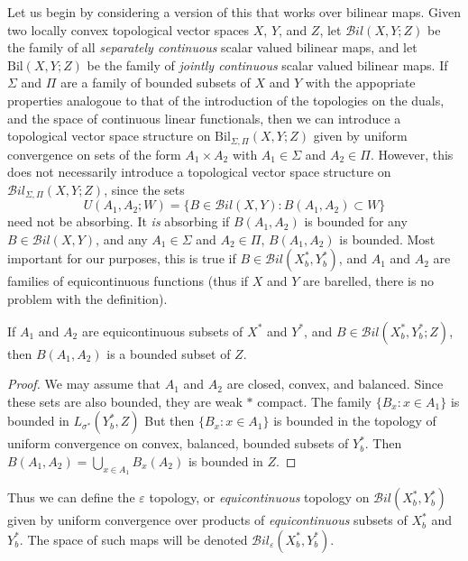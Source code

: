 Let us begin by considering a version of this that works over bilinear maps. Given two locally convex topological vector spaces $X$, $Y$, and $Z$, let $\mathcal{B}il(X,Y;Z)$ be the family of all \emph{separately continuous} scalar valued bilinear maps, and let $\text{Bil}(X,Y;Z)$ be the family of \emph{jointly continuous} scalar valued bilinear maps. If $\Sigma$ and $\Pi$ are a family of bounded subsets of $X$ and $Y$ with the appopriate properties analogoue to that of the introduction of the topologies on the duals, and the space of continuous linear functionals, then we can introduce a topological vector space structure on $\text{Bil}_{\Sigma,\Pi}(X,Y;Z)$ given by uniform convergence on sets of the form $A_1 \times A_2$ with $A_1 \in \Sigma$ and $A_2 \in \Pi$. However, this does not necessarily introduce a topological vector space structure on $\mathcal{B}il_{\Sigma,\Pi}(X,Y;Z)$, since the sets
%
\[ U(A_1,A_2;W) = \{ B \in \mathcal{B}il(X,Y): B(A_1, A_2) \subset W \} \]
%
need not be absorbing. It \emph{is} absorbing if $B(A_1,A_2)$ is bounded for any $B \in \mathcal{B}il(X,Y)$, and any $A_1 \in \Sigma$ and $A_2 \in \Pi$, $B(A_1,A_2)$ is bounded. Most important for our purposes, this is true if $B \in \mathcal{B}il(X^*_b, Y^*_b)$, and $A_1$ and $A_2$ are families of equicontinuous functions (thus if $X$ and $Y$ are barelled, there is no problem with the definition).

\begin{lemma}
    If $A_1$ and $A_2$ are equicontinuous subsets of $X^*$ and $Y^*$, and $B \in \mathcal{B}il(X^*_b, Y^*_b; Z)$, then $B(A_1,A_2)$ is a bounded subset of $Z$.
\end{lemma}
\begin{proof}
    We may assume that $A_1$ and $A_2$ are closed, convex, and balanced. Since these sets are also bounded, they are weak $*$ compact. The family $\{ B_x: x \in A_1 \}$ is bounded in $L_{\sigma^*}(Y^*_b,Z)$ But then $\{ B_x : x \in A_1 \}$ is bounded in the topology of uniform convergence on convex, balanced, bounded subsets of $Y^*_b$. Then $B(A_1,A_2) = \bigcup_{x \in A_1} B_x(A_2)$ is bounded in $Z$.
\end{proof}

Thus we can define the $\varepsilon$ topology, or \emph{equicontinuous} topology on $\mathcal{B}il(X^*_b, Y^*_b)$ given by uniform convergence over products of \emph{equicontinuous} subsets of $X^*_b$ and $Y^*_b$. The space of such maps will be denoted $\mathcal{B}il_\varepsilon(X^*_b, Y^*_b)$.

